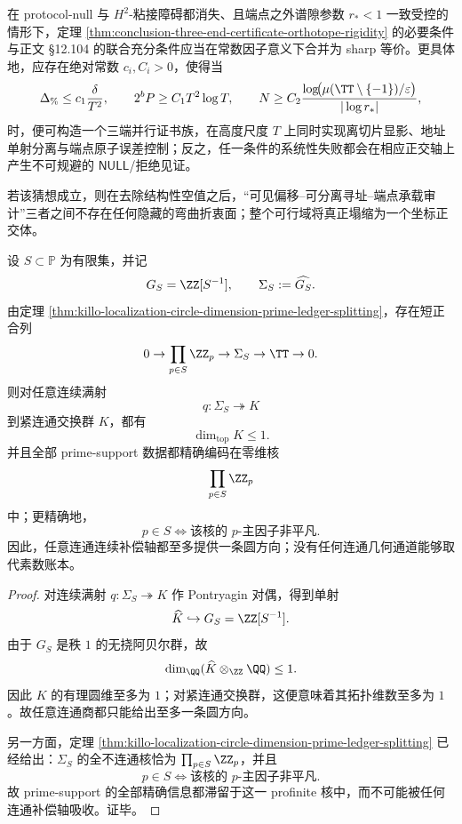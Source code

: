 \begin{conjecture}[三端证书正交体的渐近完备性]\label{conj:conclusion-three-end-certificate-orthotope-asymptotic-completeness}
在 protocol-null 与 \(H^2\)-粘接障碍都消失、且端点之外谱隙参数 \(r_*<1\) 一致受控的情形下，定理 \ref{thm:conclusion-three-end-certificate-orthotope-rigidity} 的必要条件与正文 \S12.104 的联合充分条件应当在常数因子意义下合并为 sharp 等价。更具体地，应存在绝对常数 \(c_i,C_i>0\)，使得当
\[
\Delta_{\%}\le c_1\frac{\delta}{T^2},
\qquad
2^bP\ge C_1T^2\log T,
\qquad
N\ge C_2\frac{\log\!\bigl(\mu(\TT\setminus\{-1\})/\varepsilon\bigr)}{|\log r_*|},
\]
时，便可构造一个三端并行证书族，在高度尺度 \(T\) 上同时实现离切片显影、地址单射分离与端点原子误差控制；反之，任一条件的系统性失败都会在相应正交轴上产生不可规避的 \(\mathsf{NULL}\)/拒绝见证。

若该猜想成立，则在去除结构性空值之后，“可见偏移--可分离寻址--端点承载审计”三者之间不存在任何隐藏的弯曲折衷面；整个可行域将真正塌缩为一个坐标正交体。
\end{conjecture}

\begin{theorem}\label{thm:conclusion-connected-compensation-axis-at-most-one-dimensional}
设 \(S\subset \mathbb P\) 为有限集，并记
\[
G_S=\ZZ[S^{-1}],
\qquad
\Sigma_S:=\widehat{G_S}.
\]
由定理 \ref{thm:killo-localization-circle-dimension-prime-ledger-splitting}，存在短正合列
\[
0\to \prod_{p\in S}\ZZ_p\to \Sigma_S\to \TT\to 0.
\]
则对任意连续满射
\[
q:\Sigma_S\twoheadrightarrow K
\]
到紧连通交换群 \(K\)，都有
\[
\dim_{\mathrm{top}}K\le 1.
\]
并且全部 prime-support 数据都精确编码在零维核
\[
\prod_{p\in S}\ZZ_p
\]
中；更精确地，
\[
p\in S
\iff
\text{该核的 \(p\)-主因子非平凡}.
\]
因此，任意连通连续补偿轴都至多提供一条圆方向；没有任何连通几何通道能够取代素数账本。
\end{theorem}
\begin{proof}
对连续满射 \(q:\Sigma_S\twoheadrightarrow K\) 作 Pontryagin 对偶，得到单射
\[
\widehat K\hookrightarrow G_S=\ZZ[S^{-1}].
\]
由于 \(G_S\) 是秩 \(1\) 的无挠阿贝尔群，故
\[
\dim_{\QQ}(\widehat K\otimes_{\ZZ}\QQ)\le 1.
\]
因此 \(K\) 的有理圆维至多为 \(1\)；对紧连通交换群，这便意味着其拓扑维数至多为 \(1\)。故任意连通商都只能给出至多一条圆方向。

另一方面，定理 \ref{thm:killo-localization-circle-dimension-prime-ledger-splitting} 已经给出：\(\Sigma_S\) 的全不连通核恰为 \(\prod_{p\in S}\ZZ_p\)，并且
\[
p\in S
\iff
\text{该核的 \(p\)-主因子非平凡}.
\]
故 prime-support 的全部精确信息都滞留于这一 profinite 核中，而不可能被任何连通补偿轴吸收。证毕。
\end{proof}

